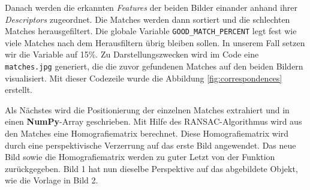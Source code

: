 Danach werden die erkannten \textit{Features} der beiden Bilder einander anhand ihrer \textit{Descriptors} zugeordnet. 
Die Matches werden dann sortiert und die schlechten Matches herausgefiltert. Die globale Variable \texttt{GOOD\_MATCH\_PERCENT} legt fest wie viele
Matches nach dem Herausfiltern übrig bleiben sollen. In unserem Fall setzen wir die Variable auf 15\%. Zu Darstellungszwecken wird im Code eine
\texttt{matches.jpg} generiert, die die zuvor gefundenen Matches auf den beiden Bildern visualisiert. Mit dieser Codezeile wurde die Abbildung 
\ref{fig:correspondences} erstellt.

Als Nächstes wird die Positionierung der einzelnen Matches extrahiert und in einen \textbf{NumPy}-Array geschrieben. Mit Hilfe des RANSAC-Algorithmus wird
aus den Matches eine Homografiematrix berechnet. Diese Homografiematrix wird durch eine perspektivische Verzerrung auf das erste Bild angewendet.
Das neue Bild sowie die Homografiematrix werden zu guter Letzt von der Funktion zurückgegeben. Bild 1 hat nun dieselbe Perspektive auf das abgebildete Objekt,
wie die Vorlage in Bild 2.

